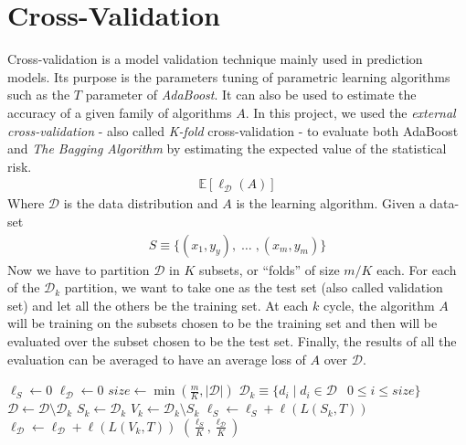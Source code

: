 \chapter{Cross-Validation}
Cross-validation is a model validation technique mainly used in prediction models. Its purpose is the parameters tuning of parametric learning algorithms such as the $T$ parameter of \textit{AdaBoost}. It can also be used to estimate the accuracy of a given family of algorithms $A$. In this project, we used the \textit{external cross-validation} - also called \textit{K-fold} cross-validation - to evaluate both AdaBoost and \textit{The Bagging Algorithm} by estimating the expected value of the statistical risk.
\begin{align*}
	\mathbb{E}[\ell_{\mathcal{D}}(A)]
\end{align*}
Where $\mathcal{D}$ is the data distribution and $A$ is the learning algorithm. Given a data-set
\begin{align*}
	S \equiv \lbrace (x_{1},y_{y}),\;\dots\;,(x_{m},y_{m}) \rbrace
\end{align*}
Now we have to partition $\mathcal{D}$ in $K$ subsets, or ``folds'' of size $m/K$ each. For each of the $\mathcal{D}_{k}$ partition, we want to take one as the test set (also called validation set) and let all the others be the training set. At each $k$ cycle, the algorithm $A$ will be training on the subsets chosen to be the training set and then will be evaluated over the subset chosen to be the test set. Finally, the results of all the evaluation can be averaged to have an average loss of $A$ over $\mathcal{D}$.

\begin{algorithm}[htpb]
	\caption{}
	\label{alg:crossvalidation}
	\begin{algorithmic}[1]
		\State $\ell_{S} \gets 0$
		\State $\ell_{\mathcal{D}} \gets 0$
			\State $size \gets \min(\frac{m}{K}, |\mathcal{D}|)$
			\State $\mathcal{D}_{k} \equiv \lbrace d_{i} \;|\; d_{i} \in \mathcal{D} \:\;\;0 \leq i \leq size\rbrace$
			\State $\mathcal{D} \gets \mathcal{D}\setminus\mathcal{D}_{k}$
		\EndFor
			\State $S_{k} \gets \mathcal{D}_{k}$
			\State $V_{k} \gets \mathcal{D}_{k}\setminus S_{k}$
			\State $\ell_{S} \gets \ell_{S} + \ell(L(S_{k}, T))$
			\State $\ell_{\mathcal{D}} \gets \ell_{\mathcal{D}} + \ell(L(V_{k}, T)) $
		\EndFor
		\Return $(\frac{\ell_{S}}{K},\frac{\ell_{\mathcal{D}}}{K})$
		\EndProcedure
	\end{algorithmic}
\end{algorithm}
